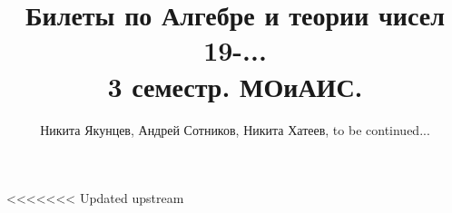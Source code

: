\documentclass[a4paper,12pt,oneside,titlepage]{article}
\title{Билеты по Алгебре и теории чисел 19-...\\ 3 семестр. МОиАИС.}
\author{Никита Якунцев, Андрей Сотников, Никита Хатеев, to be continued...}
\begin{document}
\maketitle
\tableofcontents

\theoremstyle{plain}
\newtheorem{theorem}{Теорема}
\newtheorem{lemma}{Лемма}

\theoremstyle{definition}
\newtheorem{definition}{Определение}

\renewcommand{\proofname}{
\textbf{Доказательство: }
}





<<<<<<< Updated upstream




%



\end{document}
